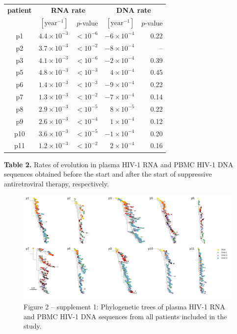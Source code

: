 \documentclass[aps,rmp,onecolumn,linenumbers]{revtex4-1}
\begin{document}
\begin{table}[tb]
\centering
\begin{tabular}{|c|r|r||r|r|}
\hline
{\bf patient} & \multicolumn{2}{c||}{{\bf RNA rate}} & \multicolumn{2}{c|}{{\bf DNA rate}}\\
& $[\mathrm{year}^{-1}]$& $p$-value & $[\mathrm{year}^{-1}]$& $p$-value \\\hline
p1 & $4.4\times 10^{-3}$ & $<10^{-6}$ & $-6\times 10^{-4}$ & 0.22 \\
p2 & $3.7\times 10^{-3}$ & $<10^{-2}$ & $-8\times 10^{-4}$ & -- \\
p3 & $4.1\times 10^{-3}$ & $<10^{-6}$ & $-2\times 10^{-4}$ & 0.39 \\
p5 & $4.8\times 10^{-3}$ & $<10^{-3}$ & $4\times 10^{-4}$ & 0.45 \\
p6 & $1.4\times 10^{-3}$ & $<10^{-3}$ & $-9\times 10^{-4}$ & 0.22 \\
p7 & $1.3\times 10^{-3}$ & $<10^{-2}$ & $-7\times 10^{-4}$ & 0.14 \\
p8 & $2.9\times 10^{-3}$ & $<10^{-5}$ & $8\times 10^{-5}$ & 0.22 \\
p9 & $2.6\times 10^{-3}$ & $<10^{-4}$ & $1\times 10^{-4}$ & 0.12 \\
p10 & $3.6\times 10^{-3}$ & $<10^{-5}$ & $-1\times 10^{-4}$ & 0.20 \\
p11 & $1.2\times 10^{-3}$ & $<10^{-2}$ & $2\times 10^{-4}$ & 0.16 \\\hline
\end{tabular}
\begin{flushleft}
{{\bf Table 2.} Rates of evolution in plasma HIV-1 RNA and PBMC HIV-1 DNA sequences obtained before the start and after the start of suppressive antiretroviral therapy, respectively.} 
\end{flushleft}
\label{tab:rates}
\end{table}
\clearpage
\renewcommand\thefigure{} 
\renewcommand{\figurename}{}
\setcounter{figure}{0} 
\renewcommand\thetable{S\arabic{table}} 
\setcounter{table}{0} 
\begin{figure}
\centering
\includegraphics[width=1.3\columnwidth,angle=90]{figures/fig2_S1}
\caption{Figure 2 -- supplement 1: Phylogenetic trees of plasma HIV-1 RNA and PBMC HIV-1 DNA sequences from all patients included in the study.}
\label{fig:supp_trees}
\end{figure}
\end{document}

